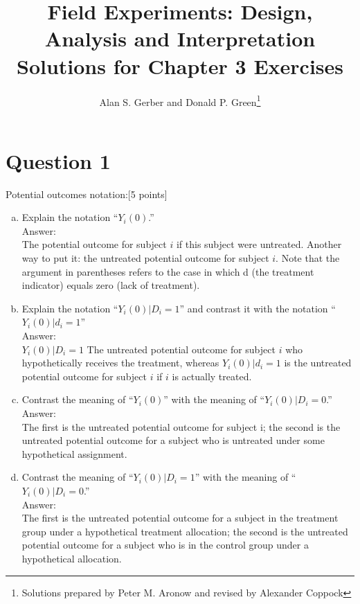 \documentclass[11pt,notitlepage]{article}\usepackage[]{graphicx}\usepackage[]{color}
\begin{document}
\title{Field Experiments: Design, Analysis and Interpretation \\
Solutions for Chapter 3 Exercises}
\author{Alan S. Gerber and Donald P. Green\footnote{Solutions prepared by Peter M. Aronow and revised by Alexander Coppock}}
\date{\vspace{-5ex}}
\maketitle


\section*{Question 1}
Potential outcomes notation:[5 points]

\begin{enumerate}[a)]
\item Explain the notation ``$Y_{i}(0)$.''\\
Answer:\\
The potential outcome for subject $i$ if this subject were untreated. Another way to put it: the untreated potential outcome for subject $i$. Note that the argument in parentheses refers to the case in which d (the treatment indicator) equals zero (lack of treatment).

\item Explain the notation ``$Y_{i}(0)|D_i=1$'' and contrast it with the notation ``$Y_{i}(0)|d_i=1$''\\
Answer:\\
$Y_{i}(0)|D_i=1$ The untreated potential outcome for subject $i$ who hypothetically receives the treatment, whereas $Y_{i}(0)|d_i=1$ is the untreated potential outcome for subject $i$ if $i$ is actually treated.

\item Contrast the meaning of ``$Y_{i}(0)$'' with the meaning of ``$Y_{i}(0)|D_{i}=0$.''\\
Answer:\\
The first is the untreated potential outcome for subject i; the second is the untreated potential outcome for a subject who is untreated under some hypothetical assignment.

\item Contrast the meaning of ``$Y_{i}(0)|D_{i}=1$'' with the meaning of ``$Y_{i}(0)|D_{i}=0$.'' \\
Answer:\\
The first is the untreated potential outcome for a subject in the treatment group under a hypothetical treatment allocation; the second is the untreated potential outcome for a subject who is in the control group under a hypothetical allocation.


\end{enumerate}
\end{document}
